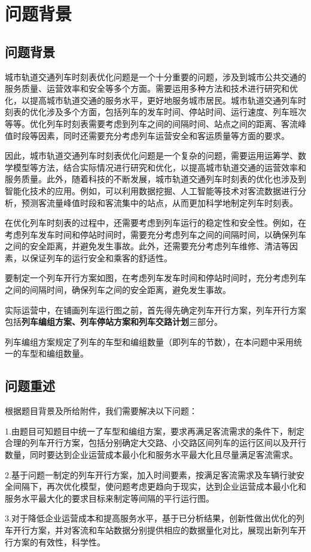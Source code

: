 \documentclass[UTF8]{ctexart}
\begin{document}
\section{问题背景}
\subsection{问题背景}
城市轨道交通列车时刻表优化问题是一个十分重要的问题，涉及到城市公共交通的服务质量、运营效率和安全等多个方面。需要运用多种方法和技术进行研究和优化，以提高城市轨道交通的服务水平，更好地服务城市居民。城市轨道交通列车时刻表的优化涉及多个方面，包括列车的发车时间、停站时间、运行速度、列车班次等等。优化列车时刻表需要考虑到列车之间的间隔时间、站点之间的距离、客流峰值时段等因素，同时还需要充分考虑列车运营安全和客运质量等方面的要求。\par
因此，城市轨道交通列车时刻表优化问题是一个复杂的问题，需要运用运筹学、数学模型等方法，结合实际情况进行研究和优化，以提高城市轨道交通的运营效率和服务质量。此外，随着科技的不断发展，城市轨道交通列车时刻表的优化也涉及到智能化技术的应用。例如，可以利用数据挖掘、人工智能等技术对客流数据进行分析，预测客流量峰值时段和客流集中的站点，从而更加科学地制定列车时刻表。\par
在优化列车时刻表的过程中，还需要考虑到列车运行的稳定性和安全性。例如，在考虑列车发车时间和停站时间时，需要充分考虑列车之间的间隔时间，以确保列车之间的安全距离，并避免发生事故。此外，还需要充分考虑列车维修、清洁等因素，以保证列车的运行安全和乘客的舒适性。\par
要制定一个列车开行方案如图，在考虑列车发车时间和停站时间时，充分考虑列车之间的间隔时间，确保列车之间的安全距离，避免发生事故。\par
实际运营中，在铺画列车运行图之前，首先得先确定列车开行方案，列车开行方案包括\textbf{列车编组方案、列车停站方案和列车交路计划}三部分。\par
列车编组方案规定了列车的车型和编组数量（即列车的节数），在本问题中采用统一的车型和编组数量。\par
\subsection{问题重述}
根据题目背景及所给附件，我们需要解决以下问题：\par
1.由题目可知题目中统一了车型和编组方案，要求再满足客流需求的条件下，制定合理的列车开行方案，包括分别确定大交路、小交路区间列车的运行区间以及开行数量，同时要达到企业运营成本最小化和服务水平最大化且尽量满足客流需求。\par
2.基于问题一制定的列车开行方案，加入时间要素，按满足客流需求及车辆行驶安全间隔下，再次优化模型，使问题考虑更趋向于现实，达到企业运营成本最小化和服务水平最大化的要求目标来制定等间隔的平行运行图。\par
3.对于降低企业运营成本和提高服务水平，基于已分析结果，创新性做出优化的列车开行方案，并对客流和车站数据分别提供相应的数据量化对比，展现出新列车开行方案的有效性，科学性。\par
\end{document}
